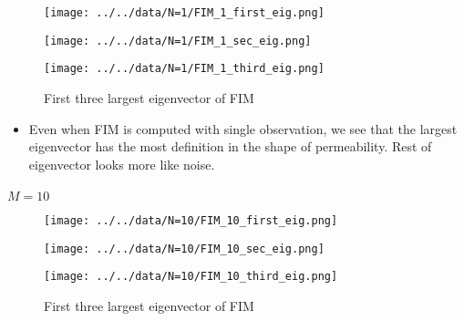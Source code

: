 \documentclass[
]{article}
\makeatletter
\let\oldparagraph\paragraph
\renewcommand{\paragraph}{
    \@ifstar
      \xxxParagraphStar
      \xxxParagraphNoStar
  }
\newcommand{\xxxParagraphStar}[1]{\oldparagraph*{#1}\mbox{}}
\newcommand{\xxxParagraphNoStar}[1]{\oldparagraph{#1}\mbox{}}
\providecommand{\tightlist}{%
  \setlength{\itemsep}{0pt}\setlength{\parskip}{0pt}}\usepackage{longtable,booktabs,array}
\makeatother
\begin{document}
\begin{figure}

\begin{minipage}{0.33\linewidth}

\texttt{[image: ../../data/N=1/FIM\_1\_first\_eig.png]}

\end{minipage}%
%
\begin{minipage}{0.33\linewidth}

\texttt{[image: ../../data/N=1/FIM\_1\_sec\_eig.png]}

\end{minipage}%
%
\begin{minipage}{0.33\linewidth}

\texttt{[image: ../../data/N=1/FIM\_1\_third\_eig.png]}

\end{minipage}%

\caption{\label{fig-eig}First three largest eigenvector of FIM}

\end{figure}%

\begin{itemize}
\tightlist
\item
  Even when FIM is computed with single observation, we see that the
  largest eigenvector has the most definition in the shape of
  permeability. Rest of eigenvector looks more like noise.
\end{itemize}

\paragraph{\texorpdfstring{\(M = 10\)}{M = 10}}\label{m-10}

\begin{figure}

\begin{minipage}{0.33\linewidth}

\texttt{[image: ../../data/N=10/FIM\_10\_first\_eig.png]}

\end{minipage}%
%
\begin{minipage}{0.33\linewidth}

\texttt{[image: ../../data/N=10/FIM\_10\_sec\_eig.png]}

\end{minipage}%
%
\begin{minipage}{0.33\linewidth}

\texttt{[image: ../../data/N=10/FIM\_10\_third\_eig.png]}

\end{minipage}%

\caption{\label{fig-eig10}First three largest eigenvector of FIM}

\end{figure}%
\end{document}
